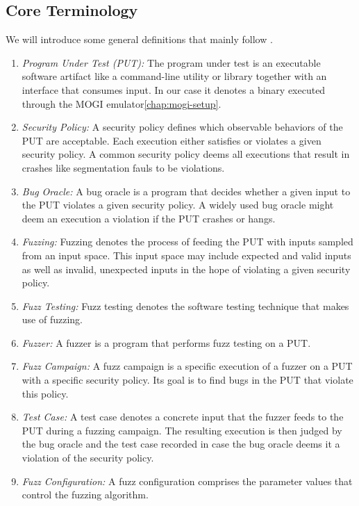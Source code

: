 \subsection{Core Terminology\label{sec:fuzzing-definitions}}

We will introduce some general definitions that mainly follow \textcite{manes_art_2019}.

\begin{enumerate}
  \item \emph{Program Under Test (PUT):}
    The program under test is an executable software artifact like a command-line utility
    or library together with an interface that consumes input. In our case it denotes
    a binary executed through the MOGI emulator\cref{chap:mogi-setup}.

  \item \emph{Security Policy:}
    A security policy defines which observable behaviors of the PUT are acceptable.
    Each execution either satisfies or violates a given security policy. A common
    security policy deems all executions that result in crashes like segmentation
    fauls to be violations.

  \item \emph{Bug Oracle:}
    A bug oracle is a program that decides whether a given input to the PUT violates
    a given security policy. A widely used bug oracle might deem an execution
    a violation if the PUT crashes or hangs.

  \item \emph{Fuzzing:}
    Fuzzing denotes the process of feeding the PUT with inputs sampled from an input space.
    This input space may include expected and valid inputs as well as invalid, unexpected
    inputs in the hope of violating a given security policy.

  \item \emph{Fuzz Testing:}
    Fuzz testing denotes the software testing technique that makes use of fuzzing.

  \item \emph{Fuzzer:}
    A fuzzer is a program that performs fuzz testing on a PUT.

  \item \emph{Fuzz Campaign:}
    A fuzz campaign is a specific execution of a fuzzer on a PUT with a specific
    security policy. Its goal is to find bugs in the PUT that violate this policy.

  \item \emph{Test Case:}
    A test case denotes a concrete input that the fuzzer feeds to the PUT during
    a fuzzing campaign. The resulting execution is then judged by the bug oracle
    and the test case recorded in case the bug oracle deems it a violation of the
    security policy.

  \item \emph{Fuzz Configuration:}
    A fuzz configuration comprises the parameter values that control the fuzzing
    algorithm.
\end{enumerate}

